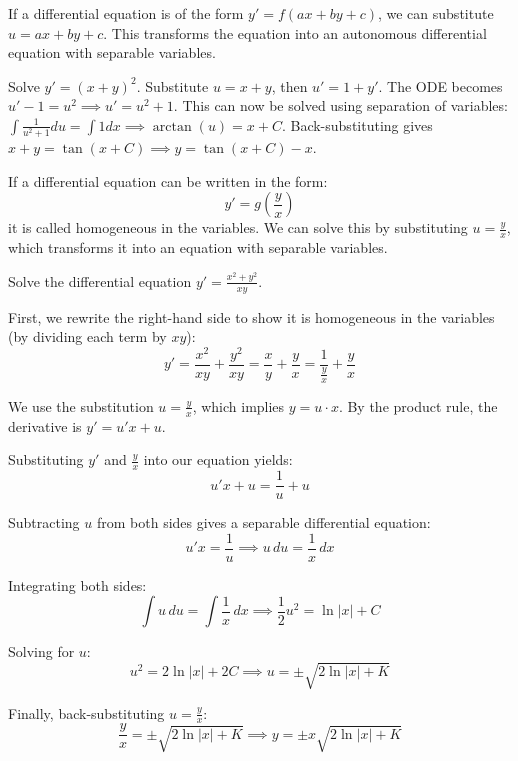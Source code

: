 \begin{theorem}
    If a differential equation is of the form $y' = f(ax + by + c)$, we can substitute $u = ax + by + c$. This transforms the equation into an autonomous differential equation with separable variables.
\end{theorem}

\begin{example}
    Solve $y' = (x+y)^2$. Substitute $u = x+y$, then $u' = 1 + y'$. 
    The ODE becomes $u' - 1 = u^2 \implies u' = u^2 + 1$. 
    This can now be solved using separation of variables: $\int \frac{1}{u^2+1} du = \int 1 dx \implies \arctan(u) = x + C$. 
    Back-substituting gives $x+y = \tan(x+C) \implies y = \tan(x+C) - x$.
\end{example}

\begin{theorem}
    If a differential equation can be written in the form:
    $$y' = g\left(\frac{y}{x}\right)$$
    it is called homogeneous in the variables. We can solve this by substituting $u = \frac{y}{x}$, which transforms it into an equation with separable variables.
\end{theorem}

\begin{example}
    Solve the differential equation $y' = \frac{x^2 + y^2}{xy}$.
    
    First, we rewrite the right-hand side to show it is homogeneous in the variables (by dividing each term by $xy$):
    $$y' = \frac{x^2}{xy} + \frac{y^2}{xy} = \frac{x}{y} + \frac{y}{x} = \frac{1}{\frac{y}{x}} + \frac{y}{x}$$
    
    We use the substitution $u = \frac{y}{x}$, which implies $y = u \cdot x$. 
    By the product rule, the derivative is $y' = u'x + u$. 
    
    Substituting $y'$ and $\frac{y}{x}$ into our equation yields:
    $$u'x + u = \frac{1}{u} + u$$
    
    Subtracting $u$ from both sides gives a separable differential equation:
    $$u'x = \frac{1}{u} \implies u \, du = \frac{1}{x} \, dx$$
    
    Integrating both sides:
    $$\int u \, du = \int \frac{1}{x} \, dx \implies \frac{1}{2}u^2 = \ln|x| + C$$
    
    Solving for $u$:
    $$u^2 = 2\ln|x| + 2C \implies u = \pm \sqrt{2\ln|x| + K}$$
    
    Finally, back-substituting $u = \frac{y}{x}$:
    $$\frac{y}{x} = \pm \sqrt{2\ln|x| + K} \implies y = \pm x \sqrt{2\ln|x| + K}$$
\end{example}


